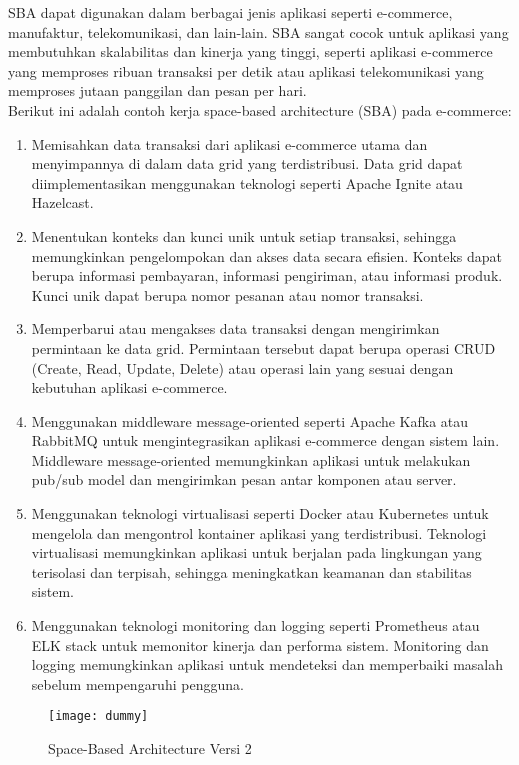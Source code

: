 SBA dapat digunakan dalam berbagai jenis aplikasi seperti e-commerce, manufaktur, telekomunikasi, dan lain-lain. SBA sangat cocok untuk aplikasi yang membutuhkan skalabilitas dan kinerja yang tinggi, seperti aplikasi e-commerce yang memproses ribuan transaksi per detik atau aplikasi telekomunikasi yang memproses jutaan panggilan dan pesan per hari.\\

Berikut ini adalah contoh kerja space-based architecture (SBA) pada e-commerce:
\begin{enumerate}
	\item  Memisahkan data transaksi dari aplikasi e-commerce utama dan menyimpannya di dalam data grid yang terdistribusi. Data grid dapat diimplementasikan menggunakan teknologi seperti Apache Ignite atau Hazelcast.
	\item  Menentukan konteks dan kunci unik untuk setiap transaksi, sehingga memungkinkan pengelompokan dan akses data secara efisien. Konteks dapat berupa informasi pembayaran, informasi pengiriman, atau informasi produk. Kunci unik dapat berupa nomor pesanan atau nomor transaksi.
	\item  Memperbarui atau mengakses data transaksi dengan mengirimkan permintaan ke data grid. Permintaan tersebut dapat berupa operasi CRUD (Create, Read, Update, Delete) atau operasi lain yang sesuai dengan kebutuhan aplikasi e-commerce.
	\item  Menggunakan middleware message-oriented seperti Apache Kafka atau RabbitMQ untuk mengintegrasikan aplikasi e-commerce dengan sistem lain. Middleware message-oriented memungkinkan aplikasi untuk melakukan pub/sub model dan mengirimkan pesan antar komponen atau server.
	\item  Menggunakan teknologi virtualisasi seperti Docker atau Kubernetes untuk mengelola dan mengontrol kontainer aplikasi yang terdistribusi. Teknologi virtualisasi memungkinkan aplikasi untuk berjalan pada lingkungan yang terisolasi dan terpisah, sehingga meningkatkan keamanan dan stabilitas sistem.
	\item  Menggunakan teknologi monitoring dan logging seperti Prometheus atau ELK stack untuk memonitor kinerja dan performa sistem. Monitoring dan logging memungkinkan aplikasi untuk mendeteksi dan memperbaiki masalah sebelum mempengaruhi pengguna.
\end{enumerate}
\begin{figure}
	\centering
	\texttt{[image: dummy]}
	\caption{Space-Based Architecture Versi 2}
\end{figure}
\vskip0.5cm
